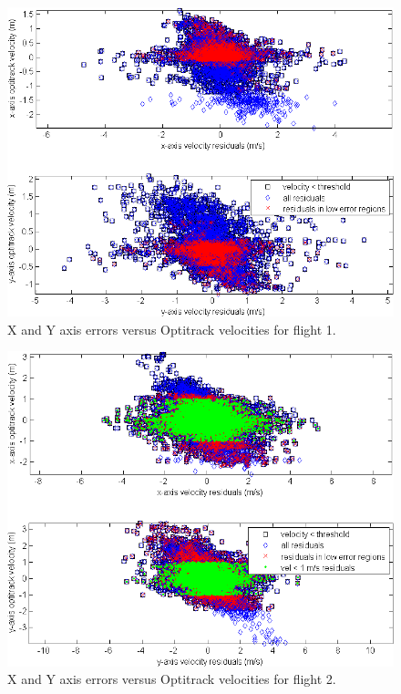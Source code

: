 \documentclass{article}
\begin{document}
\begin{figure}[p]
\centering
\includegraphics[height=0.4\textheight]{../flow figures/resids_v_vel.png}
\caption{X and Y axis errors versus Optitrack velocities for flight 1.}
\label{fig:resids_v_vel1}
\end{figure}
\begin{figure}[p]
\centering
\includegraphics[height=0.4\textheight]{../flow figures/resids_v_vel2.png}
\caption{X and Y axis errors versus Optitrack velocities for flight 2.}
\label{fig:resids_v_vel2}
\end{figure}
\end{document}
